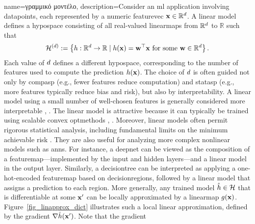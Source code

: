 {name={\foreignlanguage{greek}{γραμμικό μοντέλο}},
	description={Consider 
		an \gls{ml} application involving \gls{datapoint}s, each represented 
		by a numeric \gls{featurevec} ${\bf x} \in \mathbb{R}^{d}$. A linear \gls{model} defines 
		a \gls{hypospace} consisting of all real-valued \gls{linearmap}s from $\mathbb{R}^{d}$ to $\mathbb{R}$ such that
		\begin{equation}
			\nonumber
			\label{equ_def_lin_model_hypspace_dict}
			\mathcal{H}^{(d)} := \left\{ h: \mathbb{R}^{d} \rightarrow \mathbb{R} \mid h({\bf x}) = {\bf w}^{\top} {\bf x} \text{ for some } {\bf w} \in \mathbb{R}^{d} \right\}.
		\end{equation}
		Each value of $d$ defines a different \gls{hypospace}, corresponding to the number of 
		\gls{feature}s used to compute the \gls{prediction} $h({\bf x})$. The choice of 
		$d$ is often guided not only by \gls{compasp} (e.g., fewer features reduce computation) and 
		\gls{statasp} (e.g., more features typically reduce \gls{bias} and \gls{risk}), but also by \gls{interpretability}. 
		A linear \gls{model} using a small number of well-chosen \gls{feature}s is generally considered 
		more interpretable \cite{rudin2019stop}, \cite{Ribeiro2016}.
		The linear \gls{model} is attractive because it can typically be trained using scalable \gls{convex} \gls{optmethod}s 
		\cite{hastie01statisticallearning}, \cite{BertsekasNonLinProgr}. Moreover, linear \gls{model}s often permit rigorous 
		statistical analysis, including fundamental limits on the \gls{minimum} achievable \gls{risk} \cite{Wain2019}. 
		They are also useful for analyzing more complex nonlinear \gls{model}s such as \gls{ann}s. For instance, 
		a \gls{deepnet} can be viewed as the composition of a \gls{featuremap}—implemented by the input and 
		hidden \gls{layer}s—and a linear \gls{model} in the output \gls{layer}. Similarly, a \gls{decisiontree} can be interpreted 
		as applying a one-hot-encoded \gls{featuremap} based on \gls{decisionregion}s, followed by a linear 
		\gls{model} that assigns a \gls{prediction} to each region.
		More generally, any trained \gls{model} $\hat{h} \in \mathcal{H}$ that is 
		\gls{differentiable} at some ${\bf x}'$ can be locally approximated by a \gls{linearmap} 
		$g({\bf x})$. Figure~\ref{fig_linapprox_dict} illustrates such a local linear approximation, 
		defined by the \gls{gradient} $\nabla \hat{h}({\bf x}')$. Note that the \gls{gradient} 
}}
